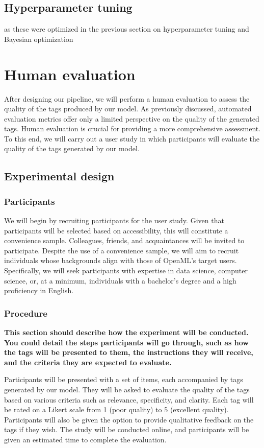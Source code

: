 \subsection{Hyperparameter tuning}
as these were optimized in the previous section on hyperparameter tuning and Bayesian optimization

\section{Human evaluation}
After designing our pipeline, we will perform a human evaluation to assess the quality of the tags produced by our model. As previously discussed, automated evaluation metrics offer only a limited perspective on the quality of the generated tags. Human evaluation is crucial for providing a more comprehensive assessment. To this end, we will carry out a user study in which participants will evaluate the quality of the tags generated by our model.

\subsection{Experimental design}
\subsubsection{Participants}
We will begin by recruiting participants for the user study. Given that participants will be selected based on accessibility, this will constitute a convenience sample. Colleagues, friends, and acquaintances will be invited to participate. Despite the use of a convenience sample, we will aim to recruit individuals whose backgrounds align with those of OpenML's target users. Specifically, we will seek participants with expertise in data science, computer science, or, at a minimum, individuals with a bachelor's degree and a high proficiency in English.

\subsubsection{Procedure}
\textbf{This section should describe how the experiment will be conducted. You could detail the steps participants will go through, such as how the tags will be presented to them, the instructions they will receive, and the criteria they are expected to evaluate.}

Participants will be presented with a set of items, each accompanied by tags generated by our model. They will be asked to evaluate the quality of the tags based on various criteria such as relevance, specificity, and clarity. Each tag will be rated on a Likert scale from 1 (poor quality) to 5 (excellent quality). Participants will also be given the option to provide qualitative feedback on the tags if they wish. The study will be conducted online, and participants will be given an estimated time to complete the evaluation.

